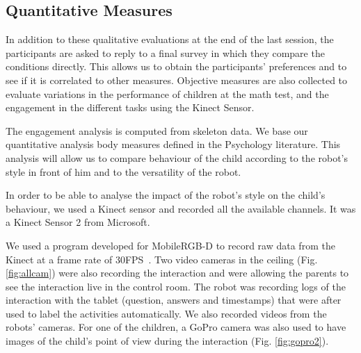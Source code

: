 \documentclass[smallextended]{svjour3}
\begin{document}
\subsection{Quantitative Measures}
In addition to these qualitative evaluations at the end of the last session, the participants are asked to reply to a final survey in which they compare the conditions directly. 
This allows us to obtain the participants' preferences and to see if it is correlated to other measures. 
Objective measures are also collected to evaluate variations in the performance of children at the math test, and the engagement in the different tasks using the Kinect Sensor.

The engagement analysis is computed from skeleton data.
We base our quantitative analysis body measures defined in the Psychology literature.
This analysis will allow us to compare behaviour of the child according to the robot's style in front of him and to the versatility of the robot.


In order to be able to analyse the impact of the robot's style on the child's behaviour, we used a Kinect sensor and recorded all the available channels. 
It was a Kinect Sensor 2 from Microsoft. 

We used a program developed for MobileRGB-D to record raw data from the Kinect at a frame rate of 30FPS~\cite{MobileRGB}. 
Two video cameras in the ceiling (Fig. \ref{fig:allcam})  were also recording the interaction and were allowing the parents to see the interaction live in the control room. 
The robot was recording logs of the interaction with the tablet (question, answers and timestamps) that were after used to label the activities  automatically.  
We also recorded videos from the robots' cameras. 
For one of the children, a GoPro camera was also used to have images of the child's point of view during the interaction (Fig. \ref{fig:gopro2}).
\end{document}
